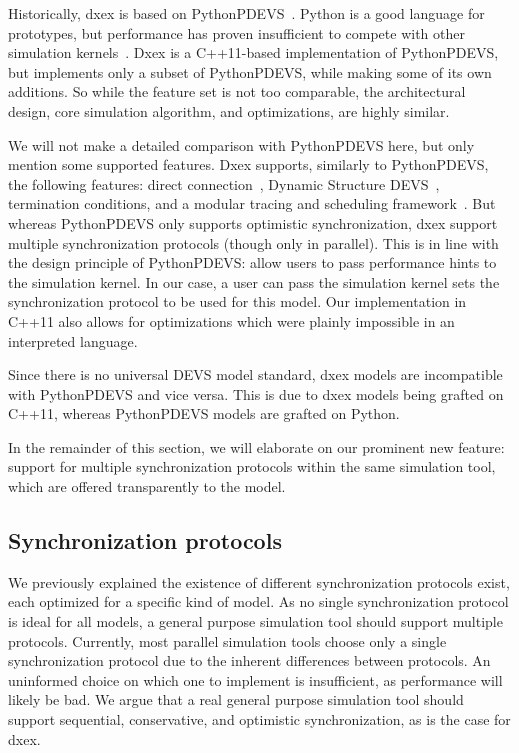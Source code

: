 Historically, dxex is based on PythonPDEVS~\cite{PythonPDEVS}.
Python is a good language for prototypes, but performance has proven insufficient to compete with other simulation kernels~\cite{MasterThesis}.
Dxex is a C++11-based implementation of PythonPDEVS, but implements only a subset of PythonPDEVS, while making some of its own additions.
So while the feature set is not too comparable, the architectural design, core simulation algorithm, and optimizations, are highly similar.

We will not make a detailed comparison with PythonPDEVS here, but only mention some supported features.
Dxex supports, similarly to PythonPDEVS, the following features: direct connection~\cite{SymbolicFlattening}, \textsf{Dynamic Structure DEVS}~\cite{DSDEVS}, termination conditions, and a modular tracing and scheduling framework~\cite{PythonPDEVS}.
But whereas PythonPDEVS only supports optimistic synchronization, dxex support multiple synchronization protocols (though only in parallel).
This is in line with the design principle of PythonPDEVS: allow users to pass performance hints to the simulation kernel.
In our case, a user can pass the simulation kernel sets the synchronization protocol to be used for this model.
Our implementation in C++11 also allows for optimizations which were plainly impossible in an interpreted language.

Since there is no universal \textsf{DEVS} model standard, dxex models are incompatible with PythonPDEVS and vice versa.
This is due to dxex models being grafted on C++11, whereas PythonPDEVS models are grafted on Python.

In the remainder of this section, we will elaborate on our prominent new feature: support for multiple synchronization protocols within the same simulation tool, which are offered transparently to the model.

\subsection{Synchronization protocols}
We previously explained the existence of different synchronization protocols exist, each optimized for a specific kind of model.
As no single synchronization protocol is ideal for all models, a general purpose simulation tool should support multiple protocols.
Currently, most parallel simulation tools choose only a single synchronization protocol due to the inherent differences between protocols.
An uninformed choice on which one to implement is insufficient, as performance will likely be bad.
We argue that a real general purpose simulation tool should support sequential, conservative, and optimistic synchronization, as is the case for dxex.

